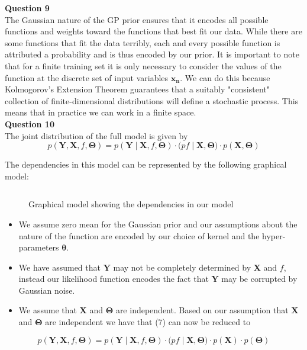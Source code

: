 \documentclass[10pt, a4paper, twocolumn]{article} %
\begin{document}
\begin{enumerate}
  \textbf{Question 9}\\
  The Gaussian nature of the GP prior ensures that it encodes all possible functions and weights toward the functions that best fit our data. While there are some functions that fit the data terribly, each and every possible function is attributed a probability and is thus encoded by our prior. It is important to note that for a finite training set it is only necessary to consider the values of the function at the discrete set of input variables $\mathbf{x_n}$. We can do this because Kolmogorov's Extension Theorem\cite{Kolmogorov} guarantees that a suitably "consistent" collection of finite-dimensional distributions will define a stochastic process. This means that in practice we can work in a finite space.\\
  
  \textbf{Question 10}\\
  The joint distribution of the full model is given by
  \begin{equation}
      p(\mathbf{Y},\mathbf{X},f,\mathbf{\Theta}) = p(\mathbf{Y}\mid\mathbf{X},f,\mathbf{\Theta})\cdot(p{f\mid\mathbf{X}, \mathbf{\Theta})}\cdot{p(\mathbf{X},\mathbf{\Theta})}
  \end{equation}
  
  The dependencies in this model can be represented by the following graphical model:
  
  \begin{figure}[H]
      \centering
      \begin{tabular}{cc}
        
      \end{tabular}
      \caption{Graphical model showing the dependencies in our model}
      \label{fig:my_label}
  \end{figure}
  
  \begin{itemize}
      \item We assume zero mean for the Gaussian prior and our assumptions about the nature of the function are encoded by our choice of kernel and the hyper-parameters $\mathbf{\theta}$.
  \end{itemize}
  \begin{itemize}
      \item We have assumed that $\mathbf{Y}$ may not be completely determined by $\mathbf{X}$ and $f$, instead our likelihood function encodes the fact that $\mathbf{Y}$ may be corrupted by Gaussian noise.
  \end{itemize}
  \begin{itemize}
      \item We assume that $\mathbf{X}$ and $\mathbf{\Theta}$ are independent. Based on our assumption that $\mathbf{X}$ and $\mathbf{\Theta}$ are independent we have that (7) can now be reduced to
     \end{itemize}
\begin{equation}
      p(\mathbf{Y},\mathbf{X},f,\mathbf{\Theta}) = p(\mathbf{Y}\mid\mathbf{X},f,\mathbf{\Theta})\cdot(p{f\mid\mathbf{X}, \mathbf{\Theta})}\cdot{p(\mathbf{X})}\cdot{p(\mathbf{\Theta})}
\end{equation}
  

\end{enumerate}
\end{document}
